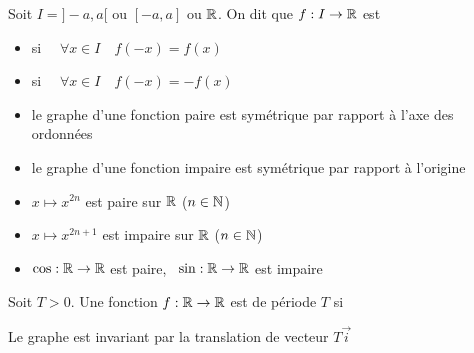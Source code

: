 \begin{frame}

\begin{mydefinition}
Soit $I=]-a,a[$ ou $[-a,a]$ ou $\mathbb{R}$. On dit que $f:I\to \mathbb{R}$ est
\begin{itemize}
  \item {} si \ \ $\forall x\in I \quad f(-x)=f(x)$
\pause
  \item {} si \ \ $\forall x\in I \quad f(-x)=-f(x)$
\end{itemize}
\end{mydefinition}

\pause 

\begin{itemize}
  \item le graphe d'une fonction paire est symétrique par rapport à l'axe des ordonnées
  \item le graphe d'une fonction impaire est symétrique par rapport à l'origine
\end{itemize}

\end{frame}

\begin{frame}

\begin{exemple}
\begin{itemize}
  \item $x\mapsto x^{2n}$ est paire sur $\mathbb{R}$ ($n\in\mathbb{N}$)
\pause  
  \item $x\mapsto x^{2n+1}$ est impaire sur $\mathbb{R}$ ($n\in\mathbb{N}$)
\pause  \pause
  \item $\cos :\mathbb{R}\to\mathbb{R}$ est paire, \ $\sin :\mathbb{R}\to\mathbb{R}$ est impaire
\end{itemize} 
\end{exemple}


\end{frame}

\begin{frame}

\begin{mydefinition}
Soit $T>0$. Une fonction $f:\mathbb{R} \to \mathbb{R}$ est  de période $T$ si 
\end{mydefinition}

\pause
Le graphe est invariant par la translation de vecteur $T \vec{i}$


\end{frame}

